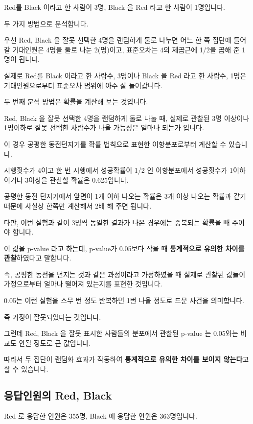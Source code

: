 \documentclass[
]{book}
\begin{document}
Red를 Black 이라고 한 사람이 3명, Black 을 Red 라고 한 사람이 1명입니다.

두 가지 방법으로 분석합니다.

우선 Red, Black 을 잘못 선택한 4명을 랜덤하게 둘로 나누면 어느 한 쪽 집단에 들어갈 기대인원은 4명을 둘로 나눈 2(명)이고, 표준오차는 4의 제곱근에 1/2을 곱해 준 1명이 됩니다.

실제로 Red를 Black 이라고 한 사람수, 3명이나 Black 을 Red 라고 한 사람수, 1명은 기대인원으로부터 표준오차 범위에 아주 잘 들어갑니다.

두 번째 분석 방법은 확률을 계산해 보는 것입니다.

Red, Black 을 잘못 선택한 4명을 랜덤하게 둘로 나눌 때, 실제로 관찰된 3명 이상이나 1명이하로 잘못 선택한 사람수가 나올 가능성은 얼마나 되는가 입니다.

이 경우 공평한 동전던지기를 확률 법칙으로 표현한 이항분포로부터 계산할 수 있습니다.

시행횟수가 4이고 한 번 시행에서 성공확률이 1/2 인 이항분포에서 성공횟수가 1이하이거나 3이상을 관찰할 확률은 0.625입니다.

공평한 동전 던지기에서 앞면이 1개 이하 나오는 확률은 3개 이상 나오는 확률과 같기 때문에 사실상 한쪽만 계산해서 2배 해 주면 됩니다.

다만, 이번 실험과 같이 3명씩 동일한 결과가 나온 경우에는 중복되는 확률을 빼 주어야 합니다.

이 값을 p-value 라고 하는데, p-value가 0.05보다 작을 때 \textbf{통계적으로 유의한 차이를 관찰}하였다고 말합니다.

즉, 공평한 동전을 던지는 것과 같은 과정이라고 가정하였을 때 실제로 관찰된 값들이 가정으로부터 얼마나 떨어져 있는지를 표현한 것입니다.

0.05는 이런 실험을 스무 번 정도 반복하면 1번 나올 정도로 드문 사건을 의미합니다.

즉 가정이 잘못되었다는 것입니다.

그런데 Red, Black 을 잘못 표시한 사람들의 분포에서 관찰된 p-value 는 0.05와는 비교도 안될 정도로 큰 값입니다.

따라서 두 집단이 랜덤화 효과가 작동하여 \textbf{통계적으로 유의한 차이를 보이지 않는다}고 할 수 있습니다.

\subsection{응답인원의 Red, Black}\label{uxc751uxb2f5uxc778uxc6d0uxc758-red-black-13}

Red 로 응답한 인원은 355명, Black 에 응답한 인원은 363명입니다.
\end{document}

